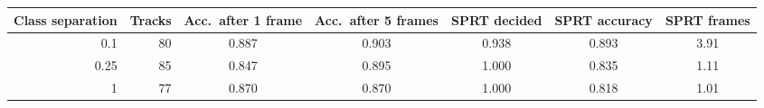 \begin{tabular}{rrccccc}\toprule
Class separation & Tracks & Acc.\ after 1 frame & Acc.\ after 5 frames & SPRT decided & SPRT accuracy & SPRT frames \\\midrule
0.1 & 80 & 0.887 & 0.903 & 0.938 & 0.893 & 3.91 \\
0.25 & 85 & 0.847 & 0.895 & 1.000 & 0.835 & 1.11 \\
1 & 77 & 0.870 & 0.870 & 1.000 & 0.818 & 1.01 \\
\bottomrule\end{tabular}
